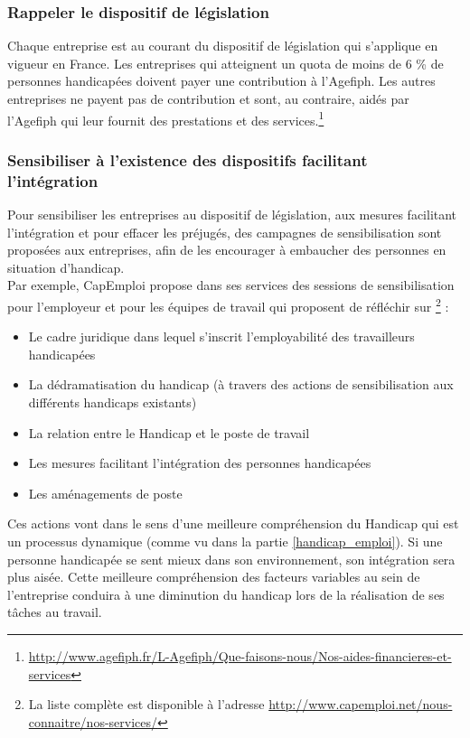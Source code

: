 \subsubsection{Rappeler le dispositif de législation}
Chaque entreprise est au courant du dispositif de législation qui s'applique en vigueur en France. Les entreprises qui atteignent un quota de moins de 6 \% de personnes handicapées doivent payer une contribution à l'Agefiph. Les autres entreprises ne payent pas de contribution et sont, au contraire, aidés par l'Agefiph qui leur fournit des prestations et des services.\footnote{\url{http://www.agefiph.fr/L-Agefiph/Que-faisons-nous/Nos-aides-financieres-et-services}}

\subsubsection{Sensibiliser à l'existence des dispositifs facilitant l'intégration}
Pour sensibiliser les entreprises au dispositif de législation, aux mesures facilitant l'intégration et pour effacer les préjugés, des campagnes de sensibilisation sont proposées aux entreprises, afin de les encourager à embaucher des personnes en situation d'handicap.\\

Par exemple, CapEmploi propose dans ses services des sessions de sensibilisation pour l'employeur et pour les équipes de travail qui proposent de réfléchir sur \footnote{La liste complète est disponible à l'adresse \url{http://www.capemploi.net/nous-connaitre/nos-services/}} :
\begin{itemize}
\item Le cadre juridique dans lequel s'inscrit l'employabilité des travailleurs handicapées
\item La dédramatisation du handicap (à travers des actions de sensibilisation aux différents handicaps existants)
\item La relation entre le Handicap et le poste de travail
\item Les mesures facilitant l'intégration des personnes handicapées
\item Les aménagements de poste\\
\end{itemize}

Ces actions vont dans le sens d'une meilleure compréhension du Handicap qui est un processus dynamique (comme vu dans la partie \ref{handicap_emploi}). Si une personne handicapée se sent mieux dans son environnement, son intégration sera plus aisée. Cette meilleure compréhension des facteurs variables au sein de l'entreprise conduira à une diminution du handicap lors de la réalisation de ses t\^aches au travail.

